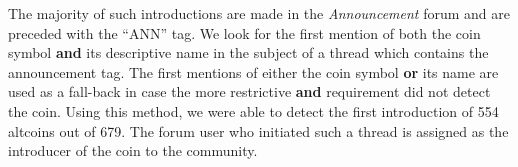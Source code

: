 The  majority of such introductions are made in the \textit{Announcement} forum and are preceded with the ``ANN'' tag. We look for the first mention of both the coin symbol \textbf{and} its descriptive name in the subject of a thread which contains the announcement tag. The first mentions of either the coin symbol \textbf{or} its name are used as a fall-back in case the more restrictive \textbf{and} requirement did not detect the coin. 
Using this method, we were able to detect the first introduction of 554 altcoins out of 679.
The forum user who initiated such a thread is assigned as the introducer of the coin to the community.


